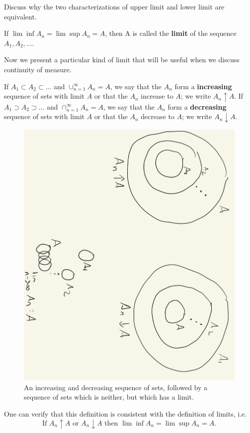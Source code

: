 \documentclass{article} %
\begin{document}
\begin{discussion}
Discuss why the two characterizations of upper limit and lower limit are equivalent.	
\end{discussion}

\begin{definition}
If $\lim\inf A_n = \lim\sup A_n = A$, then A is called the \textbf{limit} of the sequence $A_1, A_2, ...$. 
\end{definition}

Now we present a particular kind of limit that will be useful when we discuss continuity of measure. 

\begin{definition}
If $A_1 \subset A_2 \subset ...$ and $\cup_{n=1}^\infty A_n = A$, we say that the $A_n$ form a \textbf{increasing} sequence of sets with limit $A$ or that the $A_n$ increase to $A$; we write $A_n \uparrow A$.  If $A_1 \supset A_2 \supset ... $ and  	$\cap_{n=1}^\infty A_n = A$, we say that the $A_n$ form a \textbf{decreasing} sequence of sets with limit $A$ or that the $A_n$ decrease to $A$; we write $A_n \downarrow A$.
\end{definition}


\begin{figure}[h!]
\centering 
\includegraphics[width=.5\textwidth, angle=90]{images/increasing_and_decreasing_sequences}
\caption{An increasing and decreasing sequence of sets, followed by a sequence of sets which is neither, but which has a limit.}
\label{fig:increasing_and_decreasing_limits_of_sets}
\end{figure}

One can verify that this definition is consistent with the definition of limits, i.e.
\[  \text{If } A_n \uparrow A \text{ or } A_n \downarrow A \text{ then } \lim\inf A_n = \lim\sup A_n = A.\]
\end{document}
